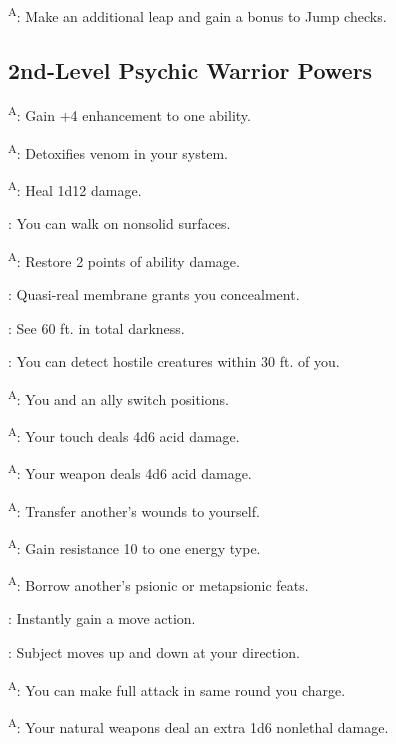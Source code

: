 \textsuperscript{A}: Make an additional leap and gain a bonus to Jump checks. %




\subsection{2nd-Level Psychic Warrior Powers}

\textsuperscript{A}: Gain +4 enhancement to one ability.

\textsuperscript{A}: Detoxifies venom in your system. %

\textsuperscript{A}: Heal 1d12 damage.

: You can walk on nonsolid surfaces.

\textsuperscript{A}: Restore 2 points of ability damage.

: Quasi-real membrane grants you concealment.

: See 60 ft. in total darkness.

: You can detect hostile creatures within 30 ft. of you.

\textsuperscript{A}: You and an ally switch positions.

\textsuperscript{A}: Your touch deals 4d6 acid damage.

\textsuperscript{A}: Your weapon deals 4d6 acid damage.

\textsuperscript{A}: Transfer another's wounds to yourself.

\textsuperscript{A}: Gain resistance 10 to one energy type.

\textsuperscript{A}: Borrow another's psionic or metapsionic feats.

: Instantly gain a move action.

: Subject moves up and down at your direction.

\textsuperscript{A}: You can make full attack in same round you charge.

\textsuperscript{A}: Your natural weapons deal an extra 1d6 nonlethal damage.

